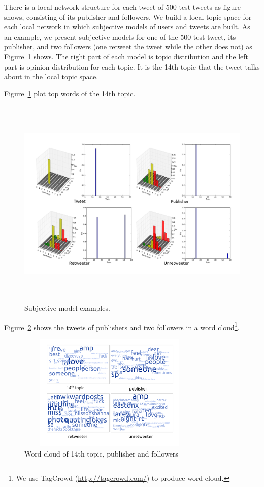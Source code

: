 \documentclass{acm_proc_article-sp}
\begin{document}
There is a local network structure for each tweet of 500 test tweets as figure shows, consisting of its publisher and followers.
We build a local topic space for each local network in which subjective models of users and tweets are built.
As an example, we present subjective models for one of the 500 test tweet, its publisher, and two followers (one retweet the tweet while the other does not) as Figure~\ref{fig:graph4} shows. The right part of each model is topic distribution and the left part is opinion distribution for each topic. It is the 14th topic that the tweet talks about in the local topic space.

Figure~\ref{fig:graph4} plot top words of the 14th topic.

\begin{figure}[htb]
\centering%
\includegraphics[width=7in,height=4in]{tweets10.pdf}
\caption{Subjective model examples.}
\label{fig:graph4}
\end{figure}

 
Figure~\ref{fig:graph5} shows the tweets of publishers and two followers in a word cloud\footnote{We use TagCrowd (\url{http://tagcrowd.com/}) to produce word cloud.}.


\begin{figure}[htb]
\centering
\includegraphics[width=3.5in,height=2.2in]{text_cloud.pdf}
\caption{Word cloud of 14th topic, publisher and followers}
\label{fig:graph5}
\end{figure}
\end{document}

